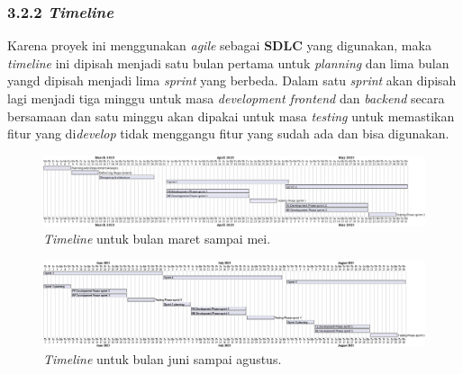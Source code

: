 \documentclass[a4paper]{article}
\begin{document}
\newpage
\subsubsection*{3.2.2 \textit{Timeline}}

Karena proyek ini menggunakan \textit{agile} sebagai \textbf{SDLC} yang digunakan, maka \textit{timeline} ini dipisah menjadi satu bulan pertama untuk \textit{planning} dan lima bulan yangd dipisah menjadi lima \textit{sprint} yang berbeda. Dalam satu \textit{sprint} akan dipisah lagi menjadi tiga minggu untuk masa \textit{development frontend} dan \textit{backend} secara bersamaan dan satu minggu akan dipakai untuk masa \textit{testing} untuk memastikan fitur yang di\textit{develop} tidak menggangu fitur yang sudah ada dan bisa digunakan.

\begin{figure}[h]
    \includegraphics[width=13cm]{sprint timeline.png}
    \centering
    \caption{\textit{Timeline} untuk bulan maret sampai mei.}
\end{figure}

\begin{figure}[h]
    \includegraphics[width=13cm]{sprint timeline 2.png}
    \centering
    \caption{\textit{Timeline} untuk bulan juni sampai agustus.}
\end{figure}

\newpage
\end{document}
